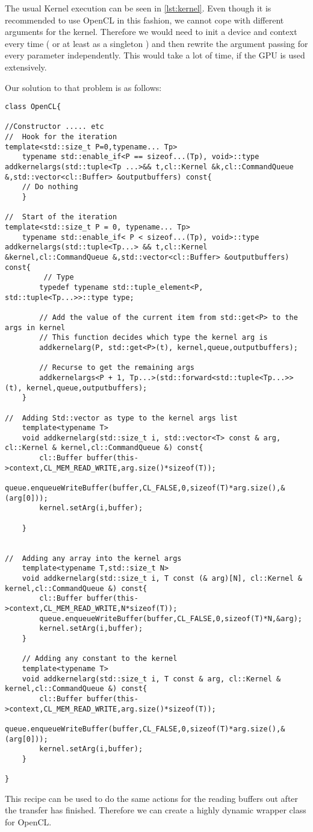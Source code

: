 The usual Kernel execution can be seen in \ref{lst:kernel}. Even though it is recommended to use OpenCL in this fashion, we cannot cope with different arguments for the kernel. Therefore we would need to init a device and context every time ( or at least as a singleton ) and then rewrite the argument passing for every parameter independently. This would take a lot of time, if the GPU is used extensively.

Our solution to that problem is as follows:

\begin{lstlisting}[caption=Add arguments to kernel dynamic way]
class OpenCL{

//Constructor ..... etc
//	Hook for the iteration
template<std::size_t P=0,typename... Tp>
	typename std::enable_if<P == sizeof...(Tp), void>::type addkernelargs(std::tuple<Tp ...>&& t,cl::Kernel &k,cl::CommandQueue &,std::vector<cl::Buffer> &outputbuffers) const{
	// Do nothing
	}
	
//  Start of the iteration
template<std::size_t P = 0, typename... Tp>
	typename std::enable_if< P < sizeof...(Tp), void>::type addkernelargs(std::tuple<Tp...> && t,cl::Kernel &kernel,cl::CommandQueue &,std::vector<cl::Buffer> &outputbuffers) const{
		 // Type
        typedef typename std::tuple_element<P, std::tuple<Tp...>>::type type;

        // Add the value of the current item from std::get<P> to the args in kernel
        // This function decides which type the kernel arg is
        addkernelarg(P, std::get<P>(t), kernel,queue,outputbuffers);

        // Recurse to get the remaining args
        addkernelargs<P + 1, Tp...>(std::forward<std::tuple<Tp...>>(t), kernel,queue,outputbuffers);
	}
	
//	Adding Std::vector as type to the kernel args list
	template<typename T>
	void addkernelarg(std::size_t i, std::vector<T> const & arg, cl::Kernel & kernel,cl::CommandQueue &) const{
		cl::Buffer buffer(this->context,CL_MEM_READ_WRITE,arg.size()*sizeof(T));
		queue.enqueueWriteBuffer(buffer,CL_FALSE,0,sizeof(T)*arg.size(),&(arg[0]));
		kernel.setArg(i,buffer);
	
	}


//	Adding any array into the kernel args
	template<typename T,std::size_t N>
	void addkernelarg(std::size_t i, T const (& arg)[N], cl::Kernel & kernel,cl::CommandQueue &) const{
		cl::Buffer buffer(this->context,CL_MEM_READ_WRITE,N*sizeof(T));
		queue.enqueueWriteBuffer(buffer,CL_FALSE,0,sizeof(T)*N,&arg);
		kernel.setArg(i,buffer);
	}
	
	// Adding any constant to the kernel
	template<typename T>
	void addkernelarg(std::size_t i, T const & arg, cl::Kernel & kernel,cl::CommandQueue &) const{
		cl::Buffer buffer(this->context,CL_MEM_READ_WRITE,arg.size()*sizeof(T));
		queue.enqueueWriteBuffer(buffer,CL_FALSE,0,sizeof(T)*arg.size(),&(arg[0]));
		kernel.setArg(i,buffer);
	}

}
\end{lstlisting}

This recipe can be used to do the same actions for the reading buffers out after the transfer has finished.
Therefore we can create a highly dynamic wrapper class for OpenCL.
